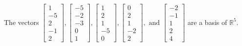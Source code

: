\begin{exercise}
\begin{exerciseStatement}
  \end{exerciseStatement}
  \begin{exerciseAnswer}
   The vectors \(\left[\begin{array}{r}
1 \\
-5 \\
2 \\
-1 \\
2
\end{array}\right] , \left[\begin{array}{r}
-5 \\
-2 \\
-3 \\
0 \\
1
\end{array}\right] , \left[\begin{array}{r}
1 \\
2 \\
1 \\
-5 \\
0
\end{array}\right] , \left[\begin{array}{r}
0 \\
2 \\
1 \\
-2 \\
2
\end{array}\right] , \text{ and } \left[\begin{array}{r}
-2 \\
-1 \\
1 \\
2 \\
4
\end{array}\right]\) 
  	 are  a basis of \(\mathbb{R}^5\).
  


  \end{exerciseAnswer}
\end{exercise}